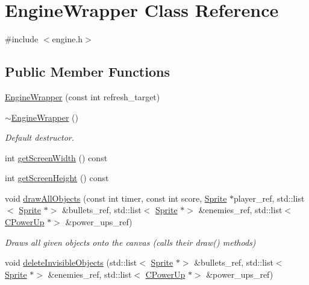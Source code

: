 \hypertarget{classEngineWrapper}{}\section{Engine\+Wrapper Class Reference}
\label{classEngineWrapper}


{\ttfamily \#include $<$engine.\+h$>$}

\subsection*{Public Member Functions}
\begin{DoxyCompactItemize}
\item 
\hyperlink{classEngineWrapper_a7d136e07dd38ffca1a37de9c35810033}{Engine\+Wrapper} (const int refresh\+\_\+target)
\item 
\hyperlink{classEngineWrapper_afe15effdb74568bc23c189cd8933034d}{$\sim$\+Engine\+Wrapper} ()
\begin{DoxyCompactList}\small\item\em Default destructor. \end{DoxyCompactList}\item 
int \hyperlink{classEngineWrapper_a8f5165549dd3ab6a738d68828c18a3d7}{get\+Screen\+Width} () const
\item 
int \hyperlink{classEngineWrapper_ad308af51b894a88370e5d29933d22e2e}{get\+Screen\+Height} () const
\item 
void \hyperlink{classEngineWrapper_aff72a50573fe66999186d0e258625199}{draw\+All\+Objects} (const int timer, const int score, \hyperlink{classSprite}{Sprite} $\ast$player\+\_\+ref, std\+::list$<$ \hyperlink{classSprite}{Sprite} $\ast$$>$ \&bullets\+\_\+ref, std\+::list$<$ \hyperlink{classSprite}{Sprite} $\ast$$>$ \&enemies\+\_\+ref, std\+::list$<$ \hyperlink{classCPowerUp}{C\+Power\+Up} $\ast$$>$ \&power\+\_\+ups\+\_\+ref)
\begin{DoxyCompactList}\small\item\em Draws all given objects onto the canvas (calls their draw() methods) \end{DoxyCompactList}\item 
void \hyperlink{classEngineWrapper_aa28f572916346dc5b658e83030e412bb}{delete\+Invisible\+Objects} (std\+::list$<$ \hyperlink{classSprite}{Sprite} $\ast$$>$ \&bullets\+\_\+ref, std\+::list$<$ \hyperlink{classSprite}{Sprite} $\ast$$>$ \&enemies\+\_\+ref, std\+::list$<$ \hyperlink{classCPowerUp}{C\+Power\+Up} $\ast$$>$ \&power\+\_\+ups\+\_\+ref)
\item 

\end{DoxyCompactItemize}
